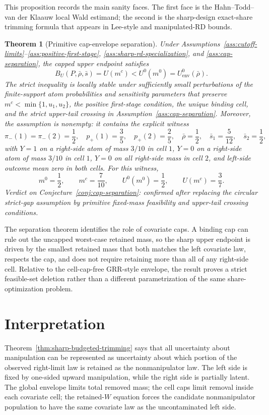 \documentclass[11pt]{article}
\theoremstyle{definition}
\theoremstyle{plain}
\newtheorem{theorem}{Theorem}
\theoremstyle{remark}
\begin{document}
This proposition records the main sanity faces.  The first face is the Hahn--Todd--van der
Klaauw local Wald estimand; the second is the sharp-design exact-share trimming formula
that appears in Lee-style and manipulated-RD bounds.

\begin{theorem}[Primitive cap-envelope separation]\label{thm:cap-separation}
Under Assumptions~\ref{ass:cutoff-limits}--\ref{ass:positive-first-stage},
\ref{ass:sharp-rd-specialization}, and \ref{ass:cap-separation}, the capped upper endpoint
satisfies
\[
  B_U(P,\bar\rho,\bar s)=U(m^c)<U^0(m^0)=U^0_{\mathrm{env}}(\bar\rho).
\]
The strict inequality is locally stable under sufficiently small perturbations of the
finite-support atom probabilities and sensitivity parameters that preserve
\(m^c<\min\{1,u_1,u_2\}\), the positive first-stage condition, the unique binding cell,
and the strict upper-tail crossing in Assumption~\ref{ass:cap-separation}.  Moreover, the
assumption is nonempty: it contains the explicit witness
\[
  \pi_-(1)=\pi_-(2)=\frac12,\quad
  p_+(1)=\frac35,\quad p_+(2)=\frac25,\quad
  \bar\rho=\frac12,\quad
  \bar s_1=\frac5{12},\quad \bar s_2=\frac12,
\]
with \(Y=1\) on a right-side atom of mass \(3/10\) in cell \(1\), \(Y=0\) on a right-side
atom of mass \(3/10\) in cell \(1\), \(Y=0\) on all right-side mass in cell \(2\), and
left-side outcome mean zero in both cells.  For this witness,
\[
  m^0=\frac12,\qquad m^c=\frac7{10},\qquad
  U^0(m^0)=\frac12,\qquad U(m^c)=\frac37.
\]
Verdict on Conjecture~\ref{conj:cap-separation}: confirmed after replacing the circular
strict-gap assumption by primitive fixed-mass feasibility and upper-tail crossing
conditions.
\end{theorem}

The separation theorem identifies the role of covariate caps.  A binding cap can rule out
the uncapped worst-case retained mass, so the sharp upper endpoint is driven by the
smallest retained mass that both matches the left covariate law, respects the cap, and
does not require retaining more than all of any right-side cell.  Relative to the
cell-cap-free GRR-style envelope, the result proves a strict feasible-set deletion rather
than a different parametrization of the same share-optimization problem.

\section{Interpretation}
Theorem~\ref{thm:sharp-budgeted-trimming} says that all uncertainty about manipulation can
be represented as uncertainty about which portion of the observed right-limit law is
retained as the nonmanipulator law.  The left side is fixed by one-sided upward
manipulation, while the right side is partially latent.  The global envelope limits total
removed mass; the cell caps limit removal inside each covariate cell; the retained-\(W\)
equation forces the candidate nonmanipulator population to have the same covariate law as
the uncontaminated left side.
\end{document}
